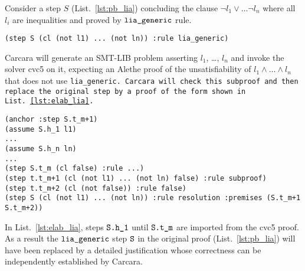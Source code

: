 \begin{example}
%
Consider a step $S$ (List.~\ref{lst:pb_lia}) concluding the clause $\neg l_1 \lor \dots \neg l_n$ where all $l_i$ are inequalities and proved by $\tt{lia\_generic}$ rule.
    
\begin{lstlisting}[language=SMT,caption={Elaborated proof},label={lst:pb_lia}]
    (step S (cl (not l1) ... (not ln)) :rule lia_generic)
\end{lstlisting}
%
Carcara will generate an SMT-LIB problem asserting $l_1$, \dots, $l_n$ and invoke the solver cvc5 on it, expecting an Alethe proof of the unsatisfiability of $l_1 \land \dots \land l_n$
that does not use \tt{lia\_generic}. Carcara will check this subproof and then replace the original step by a proof of the form shown in List.~\ref{lst:elab_lia}.

\begin{lstlisting}[language=SMT,caption={Elaboration of \tt{lia\_generic}},label={lst:elab_lia}]
(anchor :step S.t_m+1)
(assume S.h_1 l1)
...
(assume S.h_n ln)
...
(step S.t_m (cl false) :rule ...)
(step t.t_m+1 (cl (not l1) ... (not ln) false) :rule subproof)
(step t.t_m+2 (cl (not false)) :rule false)
(step S (cl (not l1) ... (not ln)) :rule resolution :premises (S.t_m+1 S.t_m+2))
\end{lstlisting}

In List.~\ref{lst:elab_lia}, steps $\tt{S.h\_1}$ until $\tt{S.t\_m}$ are imported from the cvc5 proof.
As a result the $\tt{lia\_generic}$ step $\tt{S}$ in the original proof (List.~\ref{lst:pb_lia}) will have been replaced by a detailed justification whose correctness can be independently established by Carcara.

\end{example}
